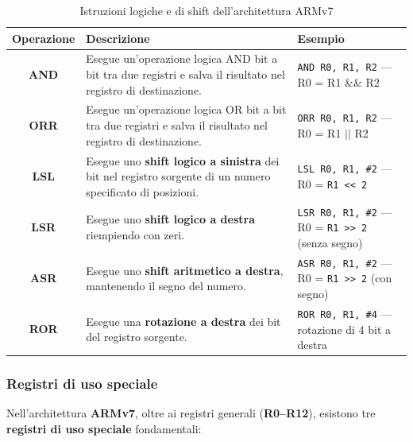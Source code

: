 \documentclass[8pt]{article}
\begin{document}
\begin{table}[h!]
\centering
\caption{Istruzioni logiche e di shift dell’architettura ARMv7}
\setlength{\tabcolsep}{10pt}
\renewcommand{\arraystretch}{1.3}
\begin{tabular}{|c|p{6cm}|p{5cm}|}
\hline
\textbf{Operazione} & \textbf{Descrizione} & \textbf{Esempio} \\ \hline

\textbf{AND} &
Esegue un’operazione logica AND bit a bit tra due registri e salva il risultato nel registro di destinazione. &
\texttt{AND R0, R1, R2} — R0 = R1 \&\& R2 \\ \hline

\textbf{ORR} &
Esegue un’operazione logica OR bit a bit tra due registri e salva il risultato nel registro di destinazione. &
\texttt{ORR R0, R1, R2} — R0 = R1 \(||\) R2 \\ \hline

\textbf{LSL} &
Esegue uno \textbf{shift logico a sinistra} dei bit nel registro sorgente di un numero specificato di posizioni. &
\texttt{LSL R0, R1, \#2} — R0 = \verb|R1 << 2| \\ \hline

\textbf{LSR} &
Esegue uno \textbf{shift logico a destra} riempiendo con zeri. &
\texttt{LSR R0, R1, \#2} — R0 =  \verb|R1 >> 2| (senza segno) \\ \hline

\textbf{ASR} &
Esegue uno \textbf{shift aritmetico a destra}, mantenendo il segno del numero. &
\texttt{ASR R0, R1, \#2} — R0 = \verb|R1 >> 2| (con segno) \\ \hline

\textbf{ROR} &
Esegue una \textbf{rotazione a destra} dei bit del registro sorgente. &
\texttt{ROR R0, R1, \#4} — rotazione di 4 bit a destra \\ \hline

\end{tabular}
\end{table}

\subsubsection{{\fontsize{12pt}{12pt}\selectfont Registri di uso speciale}}

Nell’architettura \textbf{ARMv7}, oltre ai registri generali (\textbf{R0–R12}), esistono tre \textbf{registri di uso speciale} fondamentali:
\end{document}
